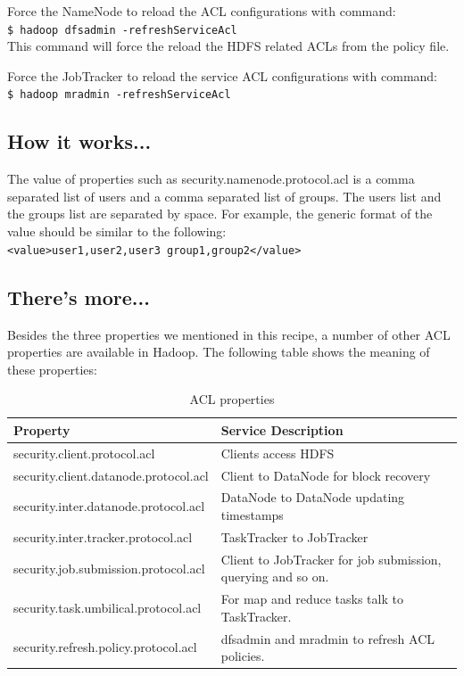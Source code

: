 Force the NameNode to reload the ACL configurations with command: \\
\verb|$ hadoop dfsadmin -refreshServiceAcl| \\

This command will force the reload the HDFS related ACLs from the policy file.

Force the JobTracker to reload the service ACL configurations with command: \\
\verb|$ hadoop mradmin -refreshServiceAcl|

\subsection*{How it works...}
The value of properties such as security.namenode.protocol.acl is a comma separated list of users and a comma separated list of groups. The users list and the groups list are separated by space. For example, the generic format of the value should be similar to the following: \\
\verb|<value>user1,user2,user3 group1,group2</value>|

\subsection*{There's more...}
Besides the three properties we mentioned in this recipe, a number of other ACL properties are available in Hadoop. The following table shows the meaning of these properties: \\
\begin{table}
  \centering
  \small
  \begin{tabular}{ll}
    \toprule
    Property & Service Description \\ \midrule
    security.client.protocol.acl & Clients access HDFS \\
    security.client.datanode.protocol.acl & Client to DataNode for block recovery \\
    security.inter.datanode.protocol.acl & DataNode to DataNode updating timestamps \\
    security.inter.tracker.protocol.acl & TaskTracker to JobTracker \\
    security.job.submission.protocol.acl & Client to JobTracker for job submission, querying and so on. \\
    security.task.umbilical.protocol.acl & For map and reduce tasks talk to TaskTracker. \\
    security.refresh.policy.protocol.acl & dfsadmin and mradmin to refresh ACL policies. \\ \bottomrule
  \end{tabular}
  \caption{ACL properties}\label{tbl:acl}
\end{table}

